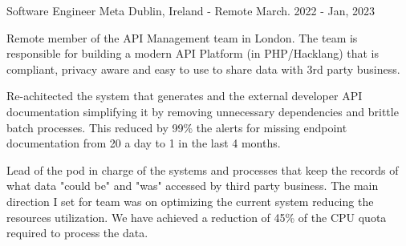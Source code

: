 \begin{cventries}
  \cventry
    {Software Engineer} %
    {Meta} %
    {Dublin, Ireland - Remote} %
    {March. 2022 - Jan, 2023} %
    {}
    {
      \begin{cvitems} %
        \item {Remote member of the API Management team in London. The team is responsible for building a modern API Platform  (in PHP/Hacklang) that is compliant, privacy aware and easy to use to share data with 3rd party business.}
        \item {Re-achitected the system that generates and the external developer API documentation simplifying it by removing unnecessary dependencies and brittle batch processes. This reduced by 99\% the alerts for missing endpoint documentation from 20 a day to 1 in the last 4 months.}
        \item {Lead of the pod in charge of the systems and processes that keep the records of what data "could be" and "was" accessed by third party business. The main direction I set for team was on optimizing the current system reducing the resources utilization. We have achieved a reduction of 45\% of the CPU quota required to process the data.}
      \end{cvitems}
    }


\end{cventries}
